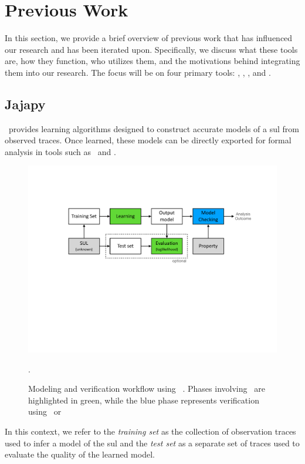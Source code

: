 \section{Previous Work}\label{sec:jajapy_and_cupaal}
In this section, we provide a brief overview of previous work that has influenced our research and has been iterated upon.
Specifically, we discuss what these tools are, how they function, who utilizes them, and the motivations behind integrating them into our research.
The focus will be on four primary tools: \Prism, \Storm, \Jajapy, and \Cupaal.


\subsection{Jajapy}\label{sec:jajapy}
\Jajapy\ provides learning algorithms designed to construct accurate models of a \gls{sul} from observed traces.
Once learned, these models can be directly exported for formal analysis in tools such as \Storm~and \Prism.


\begin{figure}
    \centering
    \includegraphics[width=\columnwidth]{figures/workflow.pdf}
    \caption{Modeling and verification workflow using \Jajapy~\cite{alearninglibraryforstochasticmodels}. Phases involving \Jajapy\ are highlighted in green, while the blue phase represents verification using \Storm\ or \Prism}.
    \label{fig:workflow}
\end{figure}


In this context, we refer to the \textit{training set} as the collection of observation traces used to infer a model of the \gls{sul} and the \textit{test set} as a separate set of traces used to evaluate the quality of the learned model.

